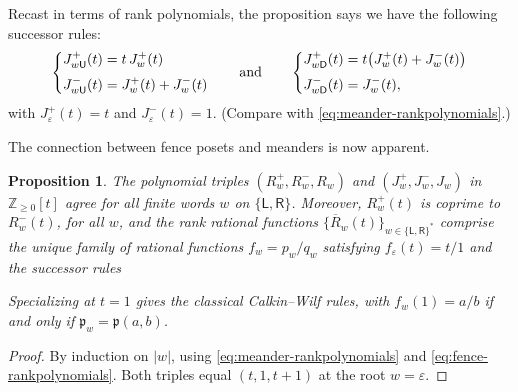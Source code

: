 \documentclass{amsart}
\def\fp{\mathfrak p} %
\def\ZZ{\mathbb Z}
\newcommand{\pab}[1][a,b]{\fp(#1)}
\newcommand{\Jfull}[1]{J_{#1}}
\newcommand{\Jtop}[1]{J_{#1}^+}
\newcommand{\Jbot}[1]{J_{#1}^-}
\newcommand{\Rfull}[1]{R_{#1}}
\newcommand{\Rtop}[1]{R_{#1}^+}
\newcommand{\Rbot}[1]{R_{#1}^-}
\def\qand{\quad\hbox{and}\quad}
\def\pL{\mathsf L}
\def\pR{\mathsf R}
\def\pU{\mathsf U}
\def\pD{\mathsf D}
\newtheorem{proposition}[theorem]{Proposition}
\theoremstyle{definition}
\begin{document}
Recast in terms of rank polynomials, the proposition says we have the following successor rules:
\begin{gather}
\label{eq:fence-rankpolynomials}
    \left\{
    \begin{aligned}
        \Jtop{w\pU}(t) &= t\, \Jtop{w}(t) \\[.5ex]
        \Jbot{w\pU}(t) &= \Jtop{w}(t)+\Jbot{w}(t)
    \end{aligned}
    \right.
%
\quad\qand\quad
%
    \left\{
    \begin{aligned}
        \Jtop{w\pD}(t) &= t\big(\Jtop{w}(t)+\Jbot{w}(t)\big) \\[.5ex]
        \Jbot{w\pD}(t) &= \Jbot{w}(t),
    \end{aligned}
    \right.
\end{gather}
with $\Jtop{\varepsilon}(t)=t$ and $\Jbot{\varepsilon}(t)=1$. (Compare with \eqref{eq:meander-rankpolynomials}.)

The connection between fence posets and meanders is now apparent. 

\begin{proposition}
\label{th:t-Calkin-Wilf-tree}
The polynomial triples $(\Rtop{w},\Rbot{w}, \Rfull{w})$ and
$(\Jtop{w},\Jbot{w}, \Jfull{w})$ in $\ZZ_{\geq0}[t]$ agree for all finite words $w$ on $\{\pL,\pR\}$. Moreover, 
$\Rtop{w}(t)$ is coprime to $\Rbot{w}(t)$, for all $w$, and the rank rational functions $\{\overline{R}_{w}(t)\}_{w \in \{\pL,\pR\}^*}$ comprise the unique family of rational functions $f_w=p_w/q_w$ satisfying $f_\varepsilon(t)=t/1$ and the successor rules  
\begin{center}
\end{center}
Specializing at $t=1$ gives the classical Calkin--Wilf rules, with $f_w(1) = a/b$ if and only if $\fp_w = \pab$.
\end{proposition}

\begin{proof}
By induction on $|w|$, using \eqref{eq:meander-rankpolynomials} and \eqref{eq:fence-rankpolynomials}. Both triples equal $(t,1,t+1)$ at the root $w=\varepsilon$.
\end{proof}
\end{document}
